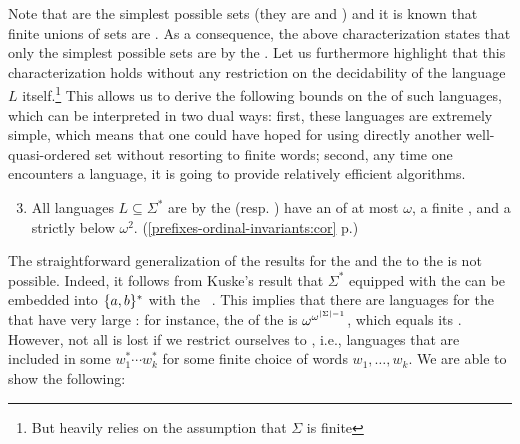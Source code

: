 Note that  are the simplest possible  sets
(they are  and ) and it is known that finite unions
of  sets are . As a consequence,
the above characterization states that only the simplest possible
 sets are  by the . Let us furthermore highlight that this characterization holds
without any restriction on the decidability of the language $L$ itself.\footnote{But
heavily relies on the assumption that $\Sigma$ is finite} This allows us to
derive the following bounds on the  of such
 languages, which can be interpreted in two dual ways:
first, these languages are extremely simple, which means that one could have
hoped for using directly another well-quasi-ordered set without resorting to
finite words; second, any time one encounters a 
language, it is going to provide relatively efficient algorithms.
{
\renewcommand{\labelenumi}{R\arabic{enumi}}
\begin{enumerate}
    \setcounter{enumi}{2}
    \item All languages $L \subseteq \Sigma^*$ are 
         by the  
        (resp. ) have an  of at most $\omega$,
        a finite , and a  strictly
        below $\omega^2$.
        \hfill (\cref{prefixes-ordinal-invariants:cor} p.\pageref{prefixes-ordinal-invariants:cor})
\end{enumerate}
}



\AP The straightforward generalization of the results for the  and the  to the  is not
possible. Indeed, it follows from Kuske's result that $\Sigma^*$ equipped with
the  can be embedded into $\{ a,b \}^*$ with the ~\cite[Lemma 5.1]{DBLP:journals/ita/Kuske06}. This implies that there
are  languages for the  that have
very large : for instance, the 
of the  is $\omega^{\omega^{\left| \Sigma \right| - 1}}$, which
equals its  \cite[Corollary 3.9, Theorem 4.21]{DZSCSC20}.
However, not all is lost if we restrict ourselves to ,
i.e., languages that are included in some $w_1^* \cdots w_k^*$ for some finite
choice of words $w_1, \ldots, w_k$. We are able to show the following:

